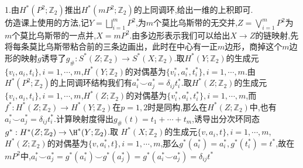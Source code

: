 \documentclass[b5paper]{ctexart}
\begin{document}
\pagestyle{plain}
\noindent
{}
1.由$H^*(P^2;\mathbb{Z}_2)$推出$H^*(mP^2;\mathbb{Z}_2)$的上同调环,给出一维的上积即可.\\
仿造课上使用的方法,记$Y=\bigsqcup\limits_{i=1}^mP^2$,为$m$个莫比乌斯带的无交并,$Z=\bigvee\limits_{i=1}^mP^2$为$m$个莫比乌斯带的一点并,$X=mP^2$.由多边形表示我们可以给出$X\to Z$的链映射,先将每条莫比乌斯带粘合前的三条边画出，此时在中心有一正$m$边形，商掉这个$m$边形的映射$g$诱导了$g_{\#}:S^*(Z;\mathbb{Z}_2)\to S^*(X;\mathbb{Z}_2)$.取$H^*(Y;\mathbb{Z}_2)$的生成元$\{v_i,a_i,t_i\},i=1,\cdots,m$,$H^*(Y;\mathbb{Z}_2)$的对偶基为$\{v^*_i,a^*_i,t^*_i\},i=1,\cdots,m$.由$H^*(P^2;\mathbb{Z}_2)$的上同调环结构我们有$a^*_i\smile a^*_j=\delta_{ij}t_i^*$.取$H^*(Z;\mathbb{Z}_2)$的生成元$\{v_i,a_i,t_i\},i=1,\cdots,m$,$H^*(Z;\mathbb{Z}_2)$的对偶基为$\{v^*_i,a^*_i,t^*_i\},i=1,\cdots,m$,而$f^*:H^*(Z;\mathbb{Z}_2)\to H^*(Y;\mathbb{Z}_2)$在$p=1,2$时是同构,那么在$H^*(Z;\mathbb{Z}_2)$中,也有$a^*_i\smile a^*_j=\delta_{ij}t_i^*$.计算映射度得出$g_{\#}(t)=t_1+\cdots+t_m$,诱导出分次环同态$g^*:H^*(Z;\mathbb{Z}_2)\to\H^*(Y;\mathbb{Z}_2)$.取
$H^*(X;\mathbb{Z}_2)$的生成元$\{v,a_i,t\},i=1,\cdots,m$,$H^*(Z;\mathbb{Z}_2)$的对偶基为$\{v,a^*_i,t\},i=1,\cdots,m$,那么$g^*(a_i^*)=a_i^*,g^*(t_i^*)=t^*$,故在$mP^2$中,$a_i^*\smile a_j^*=g^*(a_i^*)\smile g^*(a_j^*)=g^*(a_i^*\smile a_j^*)=\delta_{ij}t^*$
\end{document}
